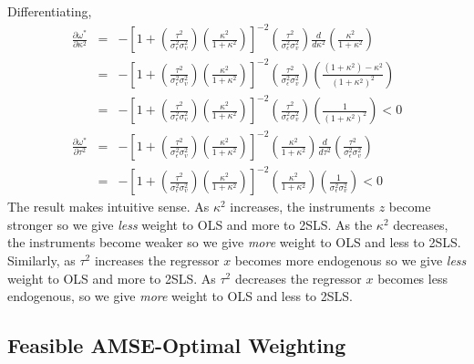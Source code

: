 \documentclass[12pt]{article}
\theoremstyle{definition}
\begin{document}
Differentiating,
  \begin{eqnarray*}
    \frac{\partial \omega^*}{\partial \kappa^2} &=& -\left[1 + \left(\frac{\tau^2}{\sigma_\epsilon^2 \sigma_v^2}\right)\left( \frac{\kappa^2}{1 + \kappa^2}\right)\right]^{-2} \left( \frac{\tau^2}{\sigma_\epsilon^2 \sigma_v^2} \right) \frac{d}{d\kappa^2} \left(\frac{\kappa^2}{1 + \kappa^2} \right)\\
      &=&  -\left[1 + \left(\frac{\tau^2}{\sigma_\epsilon^2 \sigma_v^2}\right)\left( \frac{\kappa^2}{1 + \kappa^2}\right)\right]^{-2} \left( \frac{\tau^2}{\sigma_\epsilon^2 \sigma_v^2} \right)  \left(\frac{(1+ \kappa^2) - \kappa^2}{(1 + \kappa^2)^2} \right)\\
      &=& -\left[1 + \left(\frac{\tau^2}{\sigma_\epsilon^2 \sigma_v^2}\right)\left( \frac{\kappa^2}{1 + \kappa^2}\right)\right]^{-2} \left( \frac{\tau^2}{\sigma_\epsilon^2 \sigma_v^2} \right)  \left(\frac{1}{(1 + \kappa^2)^2} \right) < 0\\
    \frac{\partial \omega^*}{\partial \tau^2} &=&-\left[1 + \left(\frac{\tau^2}{\sigma_\epsilon^2 \sigma_v^2}\right)\left( \frac{\kappa^2}{1 + \kappa^2}\right)\right]^{-2}\left(\frac{\kappa^2}{1 + \kappa^2} \right)\frac{d}{d\tau^2}\left( \frac{\tau^2}{\sigma_\epsilon^2 \sigma_v^2} \right) \\
    &=&-\left[1 + \left(\frac{\tau^2}{\sigma_\epsilon^2 \sigma_v^2}\right)\left( \frac{\kappa^2}{1 + \kappa^2}\right)\right]^{-2}\left(\frac{\kappa^2}{1 + \kappa^2} \right)\left( \frac{1}{\sigma_\epsilon^2 \sigma_v^2} \right) < 0 
  \end{eqnarray*}
  The result makes intuitive sense. As $\kappa^2$ increases, the instruments $z$ become stronger so we give \emph{less} weight to OLS and more to 2SLS. As the $\kappa^2$ decreases, the instruments become weaker so we give \emph{more} weight to OLS and less to 2SLS. Similarly, as $\tau^2$ increases the regressor $x$ becomes more endogenous so we give \emph{less} weight to OLS and more to 2SLS. As $\tau^2$ decreases the regressor $x$ becomes less endogenous, so we give \emph{more} weight to OLS and less to 2SLS.

\subsection{Feasible AMSE-Optimal Weighting} %
\label{sub:feasible_amse_optimal_weighting}
\end{document}
